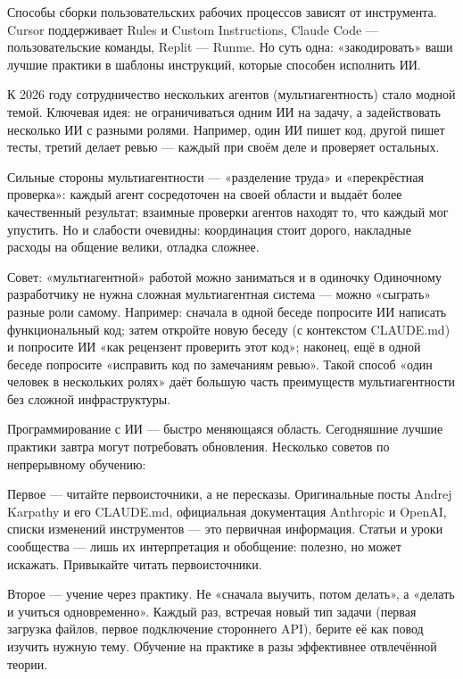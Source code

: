 Способы сборки пользовательских рабочих процессов зависят от инструмента. Cursor поддерживает Rules и Custom Instructions, Claude Code — пользовательские команды, Replit — Runme. Но суть одна: «закодировать» ваши лучшие практики в шаблоны инструкций, которые способен исполнить ИИ.


К 2026 году сотрудничество нескольких агентов (мультиагентность) стало модной темой. Ключевая идея: не ограничиваться одним ИИ на задачу, а задействовать несколько ИИ с разными ролями. Например, один ИИ пишет код, другой пишет тесты, третий делает ревью — каждый при своём деле и проверяет остальных.

Сильные стороны мультиагентности — «разделение труда» и «перекрёстная проверка»: каждый агент сосредоточен на своей области и выдаёт более качественный результат; взаимные проверки агентов находят то, что каждый мог упустить. Но и слабости очевидны: координация стоит дорого, накладные расходы на общение велики, отладка сложнее.

\begin{tcbinfo}{Совет: «мультиагентной» работой можно заниматься и в одиночку}
Одиночному разработчику не нужна сложная мультиагентная система — можно «сыграть» разные роли самому. Например: сначала в одной беседе попросите ИИ написать функциональный код; затем откройте новую беседу (с контекстом CLAUDE.md) и попросите ИИ «как рецензент проверить этот код»; наконец, ещё в одной беседе попросите «исправить код по замечаниям ревью». Такой способ «один человек в нескольких ролях» даёт большую часть преимуществ мультиагентности без сложной инфраструктуры.

\end{tcbinfo}


Программирование с ИИ — быстро меняющаяся область. Сегодняшние лучшие практики завтра могут потребовать обновления. Несколько советов по непрерывному обучению:

Первое — читайте первоисточники, а не пересказы. Оригинальные посты Andrej Karpathy и его CLAUDE.md, официальная документация Anthropic и OpenAI, списки изменений инструментов — это первичная информация. Статьи и уроки сообщества — лишь их интерпретация и обобщение: полезно, но может искажать. Привыкайте читать первоисточники.

Второе — учение через практику. Не «сначала выучить, потом делать», а «делать и учиться одновременно». Каждый раз, встречая новый тип задачи (первая загрузка файлов, первое подключение стороннего API), берите её как повод изучить нужную тему. Обучение на практике в разы эффективнее отвлечённой теории.

